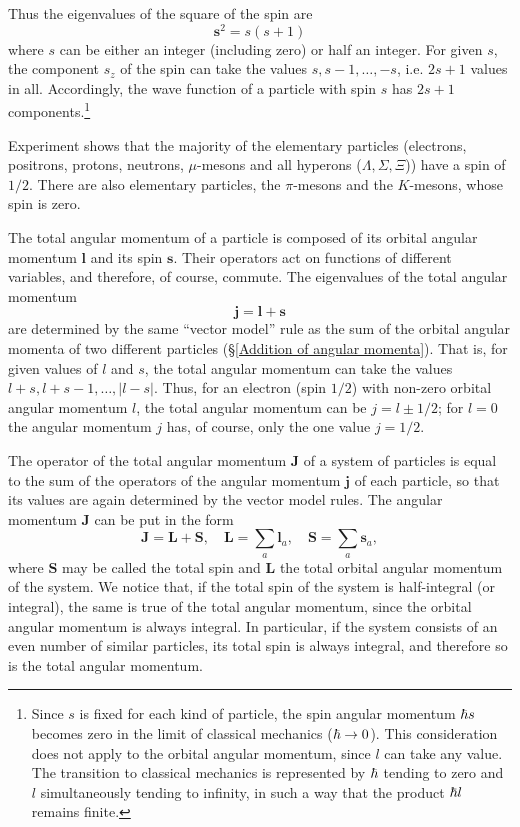 Thus the eigenvalues of the square of the spin are
\begin{equation}\label{54.2}
\bm{s}^2=s(s+1)
\end{equation}
where $ s $ can be either an integer (including zero) or half an integer. For given $ s $, the component $ s_z $ of the spin can take the values $ s, s - 1, \dots, -s $, i.e. $ 2s+1 $ values in all. Accordingly, the wave function of a particle with spin $ s $ has $ 2s + 1 $ components.\footnote{Since $ s $ is fixed for each kind of particle, the spin angular momentum $ \hbar s $ becomes zero in the limit of classical mechanics ($ \hbar\to0 $). This consideration does not apply to the orbital angular momentum, since $ l $ can take any value. The transition to classical mechanics is represented by $ \hbar $ tending to zero and $ l $ simultaneously tending to infinity, in such a way that the product $ \hbar l $ remains finite.}

Experiment shows that the majority of the elementary particles (electrons, positrons, protons, neutrons, $ \mu $-mesons and all hyperons ($ \Lambda,\Sigma,\Xi $)) have a spin of $ 1/2 $. There are also elementary particles, the $\pi$-mesons and the $ K $-mesons, whose spin is zero.

The total angular momentum of a particle is composed of its orbital angular momentum $ \bm{l} $ and its spin $ \bm{s} $. Their operators act on functions of different variables, and therefore, of course, commute. The eigenvalues of the total angular momentum
\begin{equation}\label{54.3}
\bm{j}=\bm{l}+\bm{s}
\end{equation}
are determined by the same “vector model” rule as the sum of the orbital angular momenta of two different particles (\S\ref{Addition of angular momenta}). That is, for given values of $ l $ and $ s $, the total angular momentum can take the values $ l+s, l+s- 1, \dots, |l−s| $. Thus, for an electron (spin $ 1/2 $) with non-zero orbital angular momentum $ l $, the total angular momentum can be $ j = l \pm1/2 $; for $ l = 0 $ the angular momentum $ j $ has, of course, only the one value $ j = 1/2$.

The operator of the total angular momentum $ \bm{J} $ of a system of particles is equal to the sum of the operators of the angular momentum $ \bm{j} $ of each particle, so that its values are again determined by the vector model rules. The angular momentum $ \bm{J} $ can be put in the form
\begin{equation}\label{54.4}
\bm{J}=\bm{L}+\bm{S},\quad\bm{L}=\sum_{a}\bm{l}_a,\quad\bm{S}=\sum_{a}\bm{s}_a,
\end{equation}
where $ \bm{S} $ may be called the total spin and $ \bm{L} $ the total orbital angular momentum of the system. We notice that, if the total spin of the system is half-integral (or integral), the same is true of the total angular momentum, since the orbital angular momentum is always integral. In particular, if the system consists of an even number of similar particles, its total spin is always integral, and therefore so is the total angular momentum.


